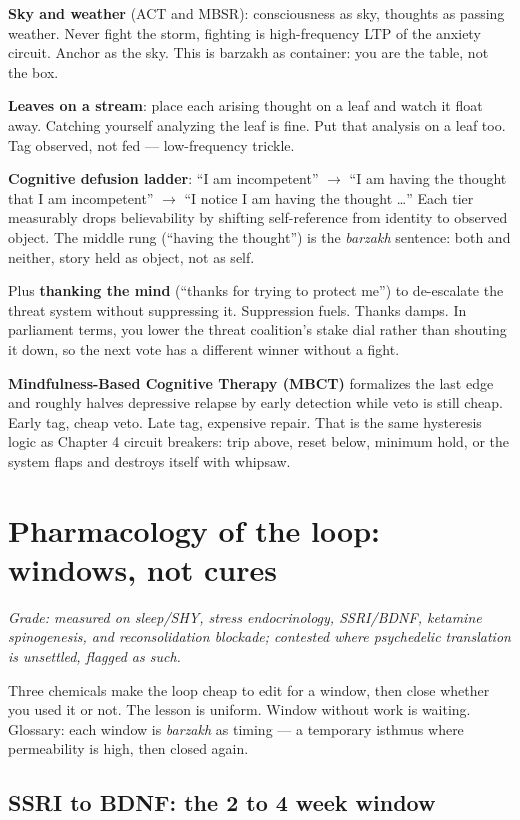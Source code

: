 \textbf{Sky and weather} (ACT and MBSR): consciousness as sky, thoughts as passing weather. Never fight the storm, fighting is high-frequency LTP of the anxiety circuit. Anchor as the sky. This is barzakh as container: you are the table, not the box.

\textbf{Leaves on a stream}: place each arising thought on a leaf and watch it float away. Catching yourself analyzing the leaf is fine. Put that analysis on a leaf too. Tag observed, not fed --- low-frequency trickle.

\textbf{Cognitive defusion ladder}: ``I am incompetent'' $\to$ ``I am having the thought that I am incompetent'' $\to$ ``I notice I am having the thought \dots'' Each tier measurably drops believability by shifting self-reference from identity to observed object. The middle rung (``having the thought'') is the \textit{barzakh} sentence: both and neither, story held as object, not as self.

Plus \textbf{thanking the mind} (``thanks for trying to protect me'') to de-escalate the threat system without suppressing it. Suppression fuels. Thanks damps. In parliament terms, you lower the threat coalition's stake dial rather than shouting it down, so the next vote has a different winner without a fight.

\textbf{Mindfulness-Based Cognitive Therapy (MBCT)} formalizes the last edge and roughly halves depressive relapse by early detection while veto is still cheap. Early tag, cheap veto. Late tag, expensive repair. That is the same hysteresis logic as Chapter 4 circuit breakers: trip above, reset below, minimum hold, or the system flaps and destroys itself with whipsaw.

\section{Pharmacology of the loop: windows, not cures}

\textit{Grade: measured on sleep/SHY, stress endocrinology, SSRI/BDNF, ketamine spinogenesis, and reconsolidation blockade; contested where psychedelic translation is unsettled, flagged as such.}

Three chemicals make the loop cheap to edit for a window, then close whether you used it or not. The lesson is uniform. Window without work is waiting. Glossary: each window is \textit{barzakh} as timing --- a temporary isthmus where permeability is high, then closed again.

\subsection{SSRI to BDNF: the 2 to 4 week window}

